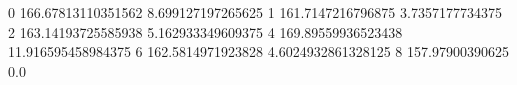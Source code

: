 0 166.67813110351562 8.699127197265625
1 161.7147216796875 3.7357177734375
2 163.14193725585938 5.162933349609375
4 169.89559936523438 11.916595458984375
6 162.5814971923828 4.6024932861328125
8 157.97900390625 0.0
